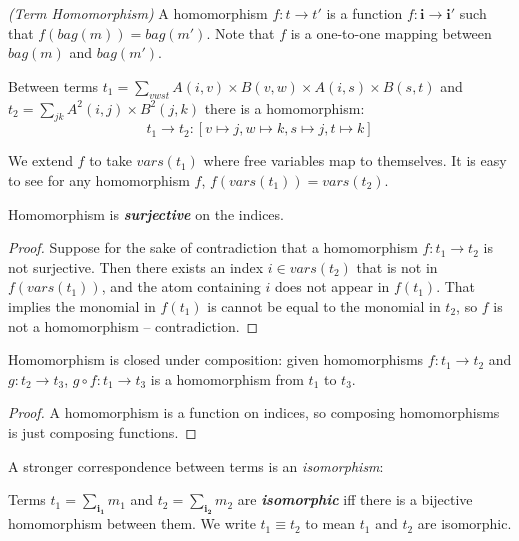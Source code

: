 \documentclass{article}
\begin{document}
\begin{definition}{\em (Term Homomorphism)}
A homomorphism $f: t \rightarrow t'$ is a function $f: \pmb{i} \rightarrow \pmb{i}'$ such that $f(bag(m))=bag(m')$. Note that $f$ is a one-to-one mapping between $bag(m)$ and $bag(m')$. 
\end{definition}{}
\begin{example}
Between terms
$t_1 = \sum_{vwst} A(i,v) \times B(v,w) \times A(i,s) \times B(s,t)$ and 
$t_2= \sum_{jk} A^2(i,j) \times B^2(j,k)$
there is a homomorphism:  $$t_1 \rightarrow t_2:[v \mapsto j, w \mapsto k, s \mapsto j, t \mapsto k]$$
\end{example}
We extend $f$ to take $vars(t_1)$ where free variables map to themselves. It is easy to see for any homomorphism $f$, $f(vars(t_1))=vars(t_2)$. 
\begin{corollary}\label{surjective}
Homomorphism is \emph{\textbf{surjective}} on the indices. 
\end{corollary}
\begin{proof}
Suppose for the sake of contradiction that a homomorphism $f: t_1 \rightarrow t_2$ is not 
surjective. Then there exists an index $i \in vars(t_2)$ that is not in $f(vars(t_1))$, 
and the atom containing $i$ does not appear in $f(t_1)$. That implies the monomial in $f(t_1)$ is cannot be equal to the monomial in $t_2$, so $f$ is not a homomorphism -- contradiction. 
\end{proof}{}

\begin{corollary}\label{compose}
Homomorphism is closed under composition: 
given homomorphisms $f: t_1 \rightarrow t_2$ and $g: t_2 \rightarrow t_3$, $g \circ f: t_1 \rightarrow t_3$ is a homomorphism from $t_1$ to $t_3$. 
\end{corollary}
\begin{proof}
A homomorphism is a function on indices, so composing homomorphisms is just composing functions. 
\end{proof}{}
A stronger correspondence between terms is an \emph{isomorphism}: 
\begin{definition}
Terms $t_1=\sum_{\pmb{i_1}}m_1$ and $t_2=\sum_{\pmb{i_2}}m_2$ are \emph{\textbf{isomorphic}} iff there is a bijective homomorphism between them. 
We write $t_1 \equiv t_2$ to mean $t_1$ and $t_2$ are isomorphic. 
\end{definition}
\end{document}
